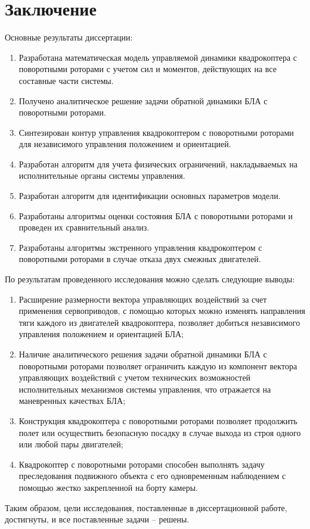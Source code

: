 \chapter{Заключение}
Основные результаты диссертации:
\begin{enumerate}
	\item Разработана математическая модель управляемой динамики квадрокоптера с поворотными роторами с учетом сил и моментов, действующих на все составные части системы.
	\item Получено аналитическое решение задачи обратной динамики БЛА с поворотными роторами.
	\item Синтезирован контур управления квадрокоптером с поворотными роторами для независимого управления положением и ориентацией. 
	\item Разработан алгоритм для учета физических ограничений, накладываемых на исполнительные органы системы управления.
	\item Разработан алгоритм для идентификации основных параметров модели.
	\item Разработаны алгоритмы оценки состояния БЛА с поворотными роторами и проведен их сравнительный анализ.
	\item Разработаны алгоритмы экстренного управления квадрокоптером с поворотными роторами в случае отказа двух смежных двигателей.
\end{enumerate}
По результатам проведенного исследования можно сделать следующие
выводы:
\begin{enumerate}
	\item Расширение размерности вектора управляющих воздействий за счет применения сервоприводов, с помощью которых можно изменять направления тяги каждого из двигателей квадрокоптера, позволяет добиться независимого управления положением и ориентацией БЛА;
	\item Наличие аналитического решения задачи обратной динамики БЛА с поворотными роторами  позволяет ограничить каждую из компонент вектора управляющих воздействий с учетом технических возможностей исполнительных механизмов системы управления, что отражается на маневренных качествах БЛА;
	\item Конструкция квадрокоптера с поворотными роторами позволяет продолжить полет или осуществить безопасную посадку в случае выхода из строя одного или любой пары двигателей;
	\item Квадрокоптер с поворотными роторами способен выполнять задачу преследования подвижного объекта с его одновременным наблюдением с помощью жестко закрепленной на борту камеры.
\end{enumerate}
Таким образом, цели исследования, поставленные в диссертационной работе, достигнуты, и все
поставленные задачи – решены.